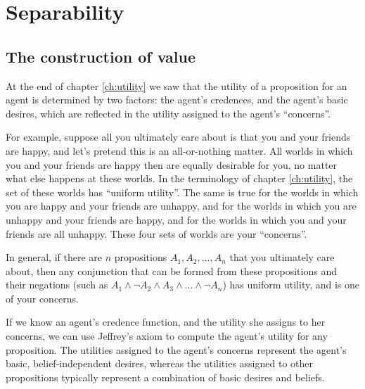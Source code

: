 \chapter{Separability}\label{ch:separability}


\section{The construction of value}\label{sec:construction-value}


At the end of chapter \ref{ch:utility} we saw that the utility of a
proposition for an agent is determined by two factors: the agent's
credences, and the agent's basic desires, which are reflected in the
utility assigned to the agent's ``concerns''.

For example, suppose all you ultimately care about is that you and
your friends are happy, and let's pretend this is an all-or-nothing
matter. All worlds in which you and your friends are happy then are
equally desirable for you, no matter what else happens at these
worlds. In the terminology of chapter \ref{ch:utility}, the set of
these worlds has ``uniform utility''. The same is true for the worlds
in which you are happy and your friends are unhappy, and for the
worlds in which you are unhappy and your friends are happy, and for
the worlds in which you and your friends are all unhappy. These four
sets of worlds are your ``concerns''.

In general, if there are $n$ propositions $A_1,A_2,\ldots,A_n$ that
you ultimately care about, then any conjunction that can be formed
from these propositions and their negations (such as
$A_1 \land \neg A_2 \land A_3 \land \ldots \land \neg A_n$) has
uniform utility, and is one of your concerns.

If we know an agent's credence function, and the utility she assigns
to her concerns, we can use Jeffrey's axiom to compute the agent's
utility for any proposition. The utilities assigned to the agent's
concerns represent the agent's basic, belief-independent desires,
whereas the utilities assigned to other propositions typically
represent a combination of basic desires and beliefs.

